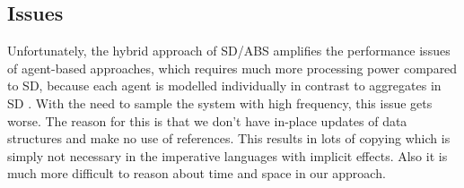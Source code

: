 \begin{comment}
Also we have built a full blown library for implementing pure agent-based simulations which implements and combines all the presented techniques including agent-transactions, event-scheduling and dynamic agent creation. As examples we implemented a number of well known agent-based models with various complexity, including the seminal and highly complex Sugarscape model \cite{epstein_growing_1996} and Schelling Segregation \cite{schelling_dynamic_1971} \footnote{The code is freely available at \url{https://github.com/thalerjonathan/chimera}}. Compared to object-oriented implementations, the pure functional ones are quite concise and highly expressive. This shows that from an engineering point-of-view a pure functional approach to ABS is as well suited as object-oriented techniques and we plan on releasing it on Hackage in the future.
\end{comment}

\subsection*{Issues}
Unfortunately, the hybrid approach of SD/ABS amplifies the performance issues of agent-based approaches, which requires much more processing power compared to SD, because each agent is modelled individually in contrast to aggregates in SD \cite{macal_agent-based_2010}. With the need to sample the system with high frequency, this issue gets worse. The reason for this is that we don't have in-place updates of data structures and make no use of references. This results in lots of copying which is simply not necessary in the imperative languages with implicit effects. Also it is much more difficult to reason about time and space in our approach. %

